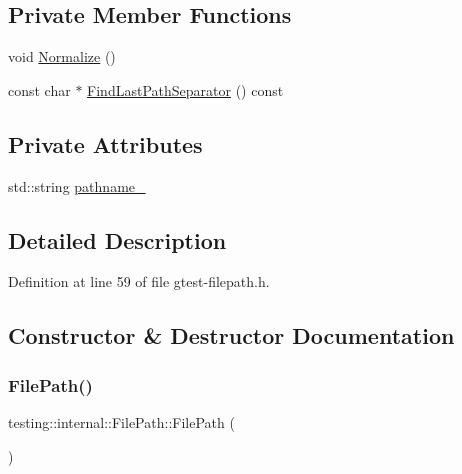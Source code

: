 \subsection*{Private Member Functions}
\begin{DoxyCompactItemize}
\item 
void \hyperlink{classtesting_1_1internal_1_1FilePath_aa2f6d7d7823f71f25de50d309c966ef7}{Normalize} ()
\item 
const char $\ast$ \hyperlink{classtesting_1_1internal_1_1FilePath_ab47f288e1e9ce5a904eccb94e86c4f99}{Find\+Last\+Path\+Separator} () const
\end{DoxyCompactItemize}
\subsection*{Private Attributes}
\begin{DoxyCompactItemize}
\item 
std\+::string \hyperlink{classtesting_1_1internal_1_1FilePath_a12ce28a0015f85604e0372230fa18d6e}{pathname\+\_\+}
\end{DoxyCompactItemize}


\subsection{Detailed Description}


Definition at line 59 of file gtest-\/filepath.\+h.



\subsection{Constructor \& Destructor Documentation}
\mbox{\label{classtesting_1_1internal_1_1FilePath_a3504a51accbca78a52fe586133ea5499}} 
\subsubsection{\texorpdfstring{File\+Path()}{FilePath()}\hspace{0.1cm}{\footnotesize\ttfamily [1/3]}}
{\footnotesize\ttfamily testing\+::internal\+::\+File\+Path\+::\+File\+Path (\begin{DoxyParamCaption}{ }\end{DoxyParamCaption})\hspace{0.3cm}{\ttfamily [inline]}}



